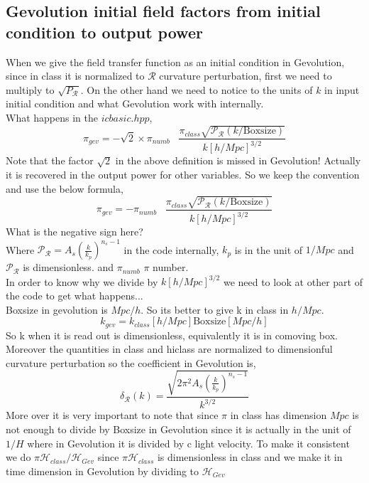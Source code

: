 \documentclass[a4paper,14pt]{article}
\newcommand {\be}{\begin{equation}}
\newcommand {\ee}{\end{equation}}
\begin{document}
\subsection{Gevolution initial field factors from initial condition to output power }
When we give the field transfer function as an initial condition in Gevolution, since in class it is normalized to $\mathcal{R}$ curvature perturbation, first we need to multiply to $\sqrt{P_{\mathcal{R}}}$. On the other hand we need to notice to the units of $k$ in input initial condition and what Gevolution work with internally. \\
What happens in the $icbasic.hpp$,
\be
\pi_{gev} = -\sqrt{2} \times \pi_{numb} \; \; \;\frac{ \pi_{class} \sqrt{\mathcal{P}_{\mathcal{R}}(k/ \text{Boxsize})  }} {k[h/Mpc]^{3/2}}
\ee
Note that the factor $\sqrt{2}$ in the above definition is missed in Gevolution! Actually it is recovered in the output power for other variables. So we keep the convention and use the below formula,
\be
\pi_{gev} = - \pi_{numb} \; \; \;\frac{ \pi_{class} \sqrt{\mathcal{P}_{\mathcal{R}}(k/ \text{Boxsize})  }} {k[h/Mpc]^{3/2}}
\ee
{\color{red} What is the negative sign here?}
\\
Where $\mathcal{P}_{\mathcal{R}}=A_s (\frac{k}{k_p})^{n_s-1}$ in the code internally, $k_p$ is in the unit of $1/Mpc$ and $\mathcal{P}_{\mathcal{R}}$ is dimensionless.
and $\pi_{numb}$ $\pi$ number. \\
In order to know why we divide by $k[h/Mpc]^{3/2}$ we need to look at other part of the code to get what happens...\\
Boxsize in gevolution is $Mpc/h$. So its better to give k in class in $h/Mpc$.
\be
k_{gev}= k_{class} [h/Mpc] \text{Boxsize}[Mpc/h]
\ee
So k when it is read out is dimensionless, equivalently it is in comoving box. \\
Moreover the quantities in class and hiclass are normalized to dimensionful curvature perturbation so the coefficient in Gevolution is,
\be
\delta_{\mathcal{R}}(k)= \frac{\sqrt{2 \pi^2 A_s(\frac{k}{k_p})^{n_s-1}}}{k^{3/2}}
\ee
More over it is very important to note that since $\pi$ in class has dimension $Mpc$ is not enough to divide by Boxsize in Gevolution since it is actually in the unit of $1/H$ where in Gevolution it is divided by c light velocity. To make it consistent we do $\pi \mathcal{H}_{class}/\mathcal{H}_{Gev}$ since $\pi \mathcal{H}_{class}$ is dimensionless in class and we make it in time dimension in Gevolution by dividing to $\mathcal{H}_{Gev}$
\\
\end{document}
